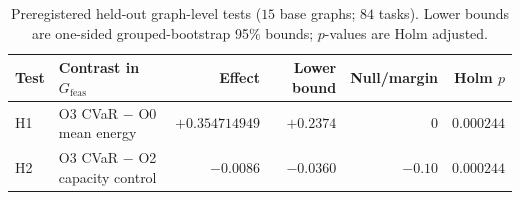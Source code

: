 
\begin{table}[t]
\centering
\caption{Preregistered held-out graph-level tests ($15$ base graphs; $84$ tasks). Lower bounds are one-sided grouped-bootstrap 95\% bounds; $p$-values are Holm adjusted.}
\label{tab:heldout-tests}
\small
\begin{tabularx}{\textwidth}{@{}lXrrrr@{}}
\toprule
Test & Contrast in $G_{\mathrm{feas}}$ & Effect & Lower bound & Null/margin & Holm $p$ \\
\midrule
H1 & O3 CVaR $-$ O0 mean energy & $+0.354714949$ & $+0.2374$ & $0$ & $0.000244$ \\
H2 & O3 CVaR $-$ O2 capacity control & $-0.0086$ & $-0.0360$ & $-0.10$ & $0.000244$ \\
\bottomrule
\end{tabularx}
\end{table}
